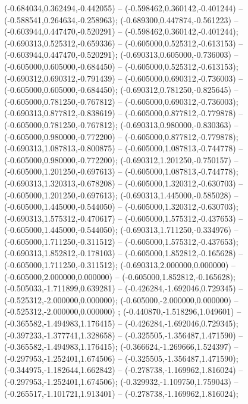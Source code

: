  (-0.684034,0.362494,-0.442055) -- (-0.598462,0.360142,-0.401244) -- (-0.588541,0.264634,-0.258963);
 (-0.689300,0.447874,-0.561223) -- (-0.603944,0.447470,-0.520291) -- (-0.598462,0.360142,-0.401244);
 (-0.690313,0.525312,-0.659336) -- (-0.605000,0.525312,-0.613153) -- (-0.603944,0.447470,-0.520291);
 (-0.690313,0.605000,-0.736003) -- (-0.605000,0.605000,-0.684450) -- (-0.605000,0.525312,-0.613153);
 (-0.690312,0.690312,-0.791439) -- (-0.605000,0.690312,-0.736003) -- (-0.605000,0.605000,-0.684450);
 (-0.690312,0.781250,-0.825645) -- (-0.605000,0.781250,-0.767812) -- (-0.605000,0.690312,-0.736003);
 (-0.690313,0.877812,-0.838619) -- (-0.605000,0.877812,-0.779878) -- (-0.605000,0.781250,-0.767812);
 (-0.690313,0.980000,-0.830363) -- (-0.605000,0.980000,-0.772200) -- (-0.605000,0.877812,-0.779878);
 (-0.690313,1.087813,-0.800875) -- (-0.605000,1.087813,-0.744778) -- (-0.605000,0.980000,-0.772200);
 (-0.690312,1.201250,-0.750157) -- (-0.605000,1.201250,-0.697613) -- (-0.605000,1.087813,-0.744778);
 (-0.690313,1.320313,-0.678208) -- (-0.605000,1.320312,-0.630703) -- (-0.605000,1.201250,-0.697613);
 (-0.690313,1.445000,-0.585028) -- (-0.605000,1.445000,-0.544050) -- (-0.605000,1.320312,-0.630703);
 (-0.690313,1.575312,-0.470617) -- (-0.605000,1.575312,-0.437653) -- (-0.605000,1.445000,-0.544050);
 (-0.690313,1.711250,-0.334976) -- (-0.605000,1.711250,-0.311512) -- (-0.605000,1.575312,-0.437653);
 (-0.690313,1.852812,-0.178103) -- (-0.605000,1.852812,-0.165628) -- (-0.605000,1.711250,-0.311512);
 (-0.690313,2.000000,0.000000) -- (-0.605000,2.000000,0.000000) -- (-0.605000,1.852812,-0.165628);
 (-0.505033,-1.711899,0.639281) -- (-0.426284,-1.692046,0.729345) -- (-0.525312,-2.000000,0.000000);
 (-0.605000,-2.000000,0.000000) -- (-0.525312,-2.000000,0.000000) ;
 (-0.440870,-1.518296,1.049601) -- (-0.365582,-1.494983,1.176415) -- (-0.426284,-1.692046,0.729345);
 (-0.397233,-1.377741,1.328658) -- (-0.325505,-1.356487,1.471590) -- (-0.365582,-1.494983,1.176415);
 (-0.366624,-1.269666,1.524397) -- (-0.297953,-1.252401,1.674506) -- (-0.325505,-1.356487,1.471590);
 (-0.344975,-1.182644,1.662842) -- (-0.278738,-1.169962,1.816024) -- (-0.297953,-1.252401,1.674506);
 (-0.329932,-1.109750,1.759043) -- (-0.265517,-1.101721,1.913401) -- (-0.278738,-1.169962,1.816024);
